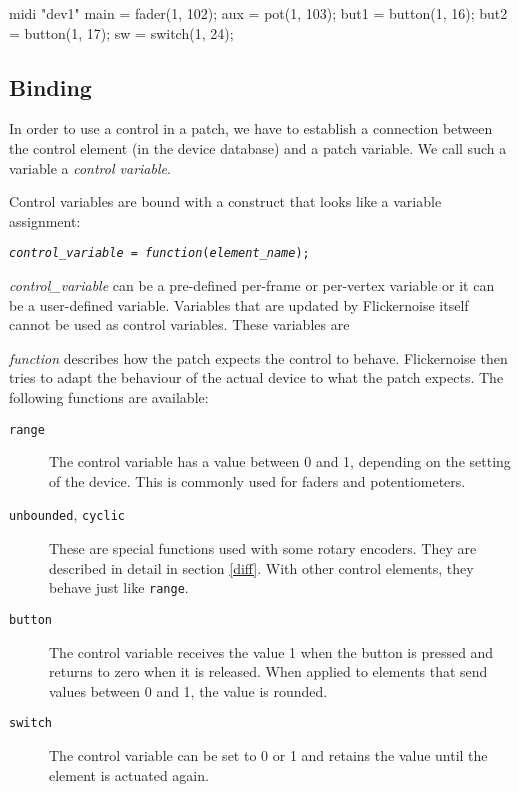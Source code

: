 \documentclass[11pt,a4paper]{article}
\newenvironment{expose}{\vskip3mm\qquad\begin{raggedright}}{%
\end{raggedright}\vskip3mm}
\begin{document}
\begin{listing}{1}
midi "dev1" {
	main = fader(1, 102);
	aux = pot(1, 103);
	but1 = button(1, 16);
	but2 = button(1, 17);
	sw = switch(1, 24);
}
\end{listing}




\subsection{Binding}

In order to use a control in a patch, we have to establish a connection
between the control element (in the device database) and a patch
variable. We call such a variable a {\em control variable}.

Control variables are bound with a construct that looks like a
variable assignment:

\begin{expose}
{\tt {\em control\_variable} = {\em function}({\em element\_name});}
\end{expose}

{\em control\_variable} can be a pre-defined per-frame or per-vertex
variable or it can be a user-defined variable. Variables that are
updated by Flickernoise itself cannot be used as control variables.
These variables are


{\em function} describes how the patch expects the control to behave.
Flickernoise then tries to adapt the behaviour of the actual device
to what the patch expects. The following functions are available:

\begin{description}
  \item[\tt range]
    The control variable has a value between 0 and 1, depending on the
    setting of the device. This is commonly used for faders and
    potentiometers.
  \item[{\tt unbounded}, {\tt cyclic}]
    These are special functions used with some rotary encoders. They
    are described in detail in section \ref{diff}. With other control
    elements, they behave just like {\tt range}.
  \item[\tt button]
    The control variable receives the value 1 when the button is
    pressed and returns to zero when it is released. When applied to
    elements that send values between 0 and 1, the value is rounded.
  \item[\tt switch]
    The control variable can be set to 0 or 1 and retains the value
    until the element is actuated again.
\end{description}
\end{document}
